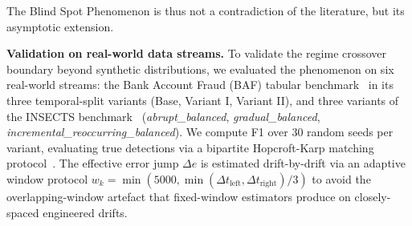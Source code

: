 \documentclass[smallextended]{svjour3}
\begin{document}
The Blind Spot Phenomenon is thus not a contradiction of the literature, but its asymptotic extension.

\textbf{Validation on real-world data streams.}
To validate the regime crossover boundary beyond synthetic distributions, we evaluated the phenomenon on six real-world streams: the Bank Account Fraud (BAF) tabular benchmark~\cite{jesus_baf_2022} in its three temporal-split variants (Base, Variant I, Variant II), and three variants of the INSECTS benchmark~\cite{souza_insects_2020} (\emph{abrupt\_balanced}, \emph{gradual\_balanced}, \emph{incremental\_reoccurring\_balanced}). We compute F1 over 30 random seeds per variant, evaluating true detections via a bipartite Hopcroft-Karp matching protocol~\cite{hopcroft_karp_1973}. The effective error jump $\Delta e$ is estimated drift-by-drift via an adaptive window protocol $w_k = \min(5000, \min(\Delta t_{\mathrm{left}}, \Delta t_{\mathrm{right}})/3)$ to avoid the overlapping-window artefact that fixed-window estimators produce on closely-spaced engineered drifts.
\end{document}
